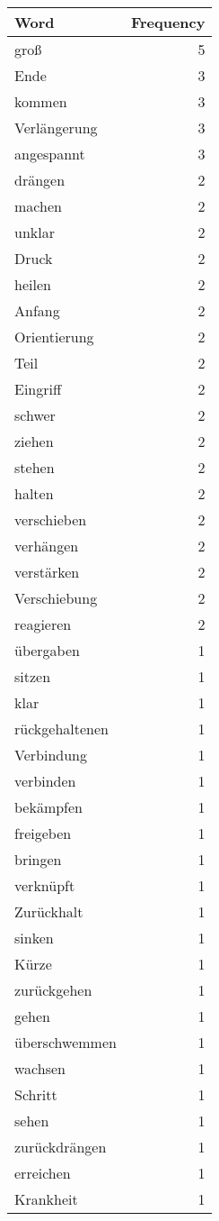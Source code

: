 \begin{tabular}{lr}
\toprule
Word & Frequency \\
\midrule
groß & 5 \\
Ende & 3 \\
kommen & 3 \\
Verlängerung & 3 \\
angespannt & 3 \\
drängen & 2 \\
machen & 2 \\
unklar & 2 \\
Druck & 2 \\
heilen & 2 \\
Anfang & 2 \\
Orientierung & 2 \\
Teil & 2 \\
Eingriff & 2 \\
schwer & 2 \\
ziehen & 2 \\
stehen & 2 \\
halten & 2 \\
verschieben & 2 \\
verhängen & 2 \\
verstärken & 2 \\
Verschiebung & 2 \\
reagieren & 2 \\
übergaben & 1 \\
sitzen & 1 \\
klar & 1 \\
rückgehaltenen & 1 \\
Verbindung & 1 \\
verbinden & 1 \\
bekämpfen & 1 \\
freigeben & 1 \\
bringen & 1 \\
verknüpft & 1 \\
Zurückhalt & 1 \\
sinken & 1 \\
Kürze & 1 \\
zurückgehen & 1 \\
gehen & 1 \\
überschwemmen & 1 \\
wachsen & 1 \\
Schritt & 1 \\
sehen & 1 \\
zurückdrängen & 1 \\
erreichen & 1 \\
Krankheit & 1 \\

\end{tabular}
